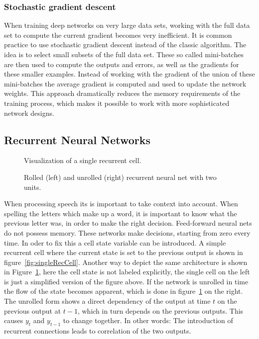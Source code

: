 \subsubsection{Stochastic gradient descent}
When training deep  networks on very large data sets, working with the full data set to compute the current gradient becomes very inefficient. It is common practice to use stochastic gradient descent instead of the classic algorithm. The idea is to select small subsets of the full data set. These so called mini-batches are then used to compute the outputs and errors, as well as the gradients for these smaller examples. Instead of working with the gradient of the union of these mini-batches the average gradient is computed and used to update the network weights. This approach dramatically reduces the memory requirements of the training process, which makes it possible to work with more sophisticated network designs.

\subsection{Recurrent Neural Networks}
\begin{figure}
\centering

\caption{Visualization of a single recurrent cell.}
\label{fig:singleRecCell}

\caption{Rolled (left) and unrolled (right) recurrent neural net with two units.}
\label{fig:unrolledNet}
\end{figure}
When processing speech its is important to take context into account. When spelling the letters which make up a word, it is important to know what the previous letter was, in order to make the right decision.
Feed-forward neural nets do not possess memory. These networks make decisions, starting from zero every time. In oder to fix this a cell state variable can be introduced. A simple recurrent cell where the current state is set to the previous output is shown in figure~\ref{fig:singleRecCell}. Another way to depict the same architecture is shown in Figure~\ref{fig:unrolledNet}, here the cell state is not labeled explicitly, the single cell on the left is just a simplified version of the figure above. If the network is unrolled in time the flow of the state becomes apparent, which is done in figure~\ref{fig:unrolledNet} on the right.
The unrolled form shows a direct dependency of the output at time $t$ on the previous output at $t-1$, which in turn depends on the previous outputs. This causes $y_t$ and $y_{t-1}$ to change together. In other words: The introduction of recurrent connections leads to correlation of the two outputs.


